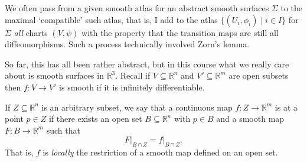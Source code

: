 \documentclass[a4paper]{scrartcl}
\begin{document}
\begin{remark}
    We often pass from a given smooth atlas for an abstract smooth surfaces $\Sigma$ to the maximal `compatible' such atlas, that is, I add to the atlas $\{(U_i, \phi_i) \mid i \in I\}$ for $\Sigma$ \emph{all} charts $(V, \psi)$ with the property that the transition maps are  still all diffeomorphisms. Such a process technically involved Zorn's lemma.
\end{remark}

So far, this has all been rather abstract, but in this course what we really care about is smooth surfaces in $\mathbb{R}^3$. Recall if $V \subseteq \mathbb{R}^n$ and $V' \subseteq \mathbb{R}^m$ are open subsets then $f: V \rightarrow V'$ is smooth if it is infinitely differentiable.

\begin{definition}
    If $Z \subseteq \mathbb{R}^n$ is an arbitrary subset, we say that a continuous map $f: Z \rightarrow \mathbb{R}^m$ is  at a point $p \in Z$ if there exists an open set $B \subseteq \mathbb{R}^n$ with $p \in B$ and a smooth map $F: B \rightarrow \mathbb{R}^m$ such that
    $$
\left.F\right|_{B \cap Z} = \left.f\right|_{B \cap Z}.
    $$
    That is, $f$ is \emph{locally} the restriction of a smooth map defined on an open set.
\end{definition}
\end{document}
